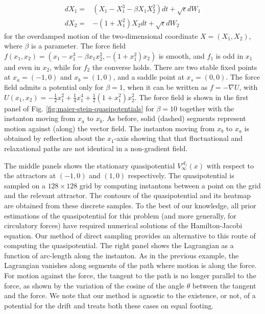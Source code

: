 \[
\begin{aligned}dX_{1}= & (X_{1}-X_{1}^{3}-\beta X_{1}X_{2}^{2})dt+\sqrt{\epsilon}dW_{1}\\
dX_{2}= & -(1+X_{1}^{2})X_{2}dt+\sqrt{\epsilon}dW_{2}
\end{aligned}
\]
for the overdamped motion of the two-dimensional coordinate $X=(X_{1},X_{2})$,
where $\beta$ is a parameter. The force field $f(x_{1},x_{2})=(x_{1}-x_{1}^{3}-\beta x_{1}x_{2}^{2},-(1+x_{1}^{2})x_{2})$
is smooth, and $f_{1}$ is odd in $x_{1}$ and even in $x_{2}$, while
for $f_{2}$ the converse holds. There are two stable fixed points
at $x_{a}=(-1,0)$ and $x_{b}=(1,0)$, and a saddle point at $x_{s}=(0,0)$.
The force field admits a potential only for $\beta=1$, when it can
be written as $f=-\nabla U$, with $U(x_{1},x_{2})=-\frac{1}{2}x_{1}^{2}+\frac{1}{4}x_{1}^{4}+\frac{1}{2}(1+x_{1}^{2})x_{2}^{2}$.
The force field is shown in the first panel of Fig. \ref{fig:maier-stein-quasipotentials}
for $\beta=10$ together with the instanton moving from $x_{a}$ to
$x_{b}$. As before, solid (dashed) segments represent motion against
(along) the vector field. The instanton moving from $x_{b}$ to $x_{a}$
is obtained by reflection about the $x_{1}$-axis showing that that
fluctuational and relaxational paths are not identical in a non-gradient
field. 

The middle panels shows the stationary quasipotential $V_{\infty}^{\mathcal{A}_{i}}(x)$
with respect to the attractors at $(-1,0)$ and $(1,0)$ respectively.
The quasipotential is sampled on a $128\times128$ grid by computing
instantons between a point on the grid and the relevant attractor.
The contours of the quasipotential and its heatmap are obtained from
these discrete samples. To the best of our knowledge, all prior estimations
of the quasipotential for this problem (and more generally, for circulatory
forces) have required numerical solutions of the Hamilton-Jacobi equation.
Our method of direct sampling provides an alternative to this route
of computing the quasipotential. The right panel shows the Lagrangian
as a function of arc-length along the instanton. As in the previous
example, the Lagrangian vanishes along segments of the path where
motion is along the force. For motion against the force, the tangent
to the path is no longer parallel to the force, as shown by the variation
of the cosine of the angle $\theta$ between the tangent and the force.
We note that our method is agnostic to the existence, or not, of a
potential for the drift and treats both these cases on equal footing.



